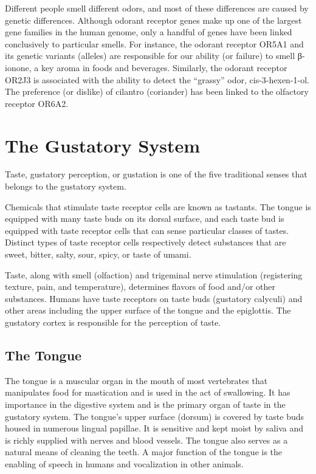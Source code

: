 \documentclass[]{book}
\begin{document}
Different people smell different odors, and most of these differences are caused by genetic differences. Although odorant receptor genes make up one of the largest gene families in the human genome, only a handful of genes have been linked conclusively to particular smells. For instance, the odorant receptor OR5A1 and its genetic variants (alleles) are responsible for our ability (or failure) to smell β-ionone, a key aroma in foods and beverages. Similarly, the odorant receptor OR2J3 is associated with the ability to detect the ``grassy'' odor, cis-3-hexen-1-ol. The preference (or dislike) of cilantro (coriander) has been linked to the olfactory receptor OR6A2.

\hypertarget{the-gustatory-system}{%
\chapter{The Gustatory System}\label{the-gustatory-system}}

Taste, gustatory perception, or gustation is one of the five traditional senses that belongs to the gustatory system.

Chemicals that stimulate taste receptor cells are known as tastants. The tongue is equipped with many taste buds on its dorsal surface, and each taste bud is equipped with taste receptor cells that can sense particular classes of tastes. Distinct types of taste receptor cells respectively detect substances that are sweet, bitter, salty, sour, spicy, or taste of umami.

Taste, along with smell (olfaction) and trigeminal nerve stimulation (registering texture, pain, and temperature), determines flavors of food and/or other substances. Humans have taste receptors on taste buds (gustatory calyculi) and other areas including the upper surface of the tongue and the epiglottis. The gustatory cortex is responsible for the perception of taste.

\hypertarget{the-tongue}{%
\section{The Tongue}\label{the-tongue}}

The tongue is a muscular organ in the mouth of most vertebrates that manipulates food for mastication and is used in the act of swallowing. It has importance in the digestive system and is the primary organ of taste in the gustatory system. The tongue's upper surface (dorsum) is covered by taste buds housed in numerous lingual papillae. It is sensitive and kept moist by saliva and is richly supplied with nerves and blood vessels. The tongue also serves as a natural means of cleaning the teeth. A major function of the tongue is the enabling of speech in humans and vocalization in other animals.
\end{document}
